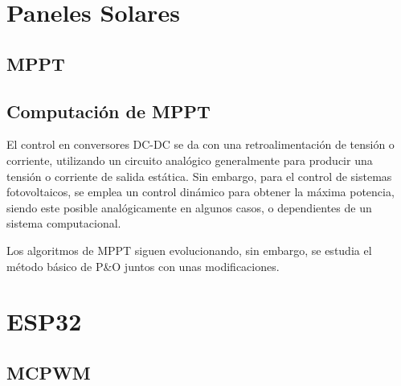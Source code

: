 \section{Paneles Solares}

\subsection{MPPT}

\subsection{Computación de MPPT}
El control en conversores DC-DC se da con una retroalimentación de tensión o corriente\cite{fundamental}, utilizando un circuito analógico generalmente para producir una tensión o corriente de salida estática. Sin embargo, para el control de sistemas fotovoltaicos, se emplea un control dinámico para obtener la máxima potencia, siendo este posible analógicamente en algunos casos, o dependientes de un sistema computacional. \par Los algoritmos de MPPT siguen evolucionando\cite{power}, sin embargo, se estudia el método básico de P\&O juntos con unas modificaciones.
\section{ESP32}
\subsection{MCPWM}
